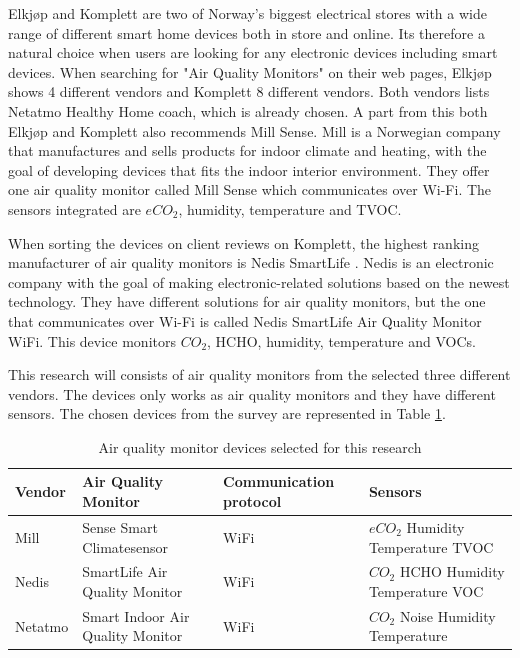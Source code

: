 Elkjøp \cite{Elkjøp} and Komplett \cite{Komplett} are two of Norway's biggest electrical stores with a wide range of different smart home devices both in store and online. Its therefore a natural choice when users are looking for any electronic devices including smart devices. When searching for "Air Quality Monitors" on their web pages, Elkjøp shows 4 different vendors and Komplett 8 different vendors. Both vendors lists Netatmo Healthy Home coach, which is already chosen. A part from this both Elkjøp and Komplett also recommends Mill Sense. Mill \cite{Mill} is a Norwegian company that manufactures and sells products for indoor climate and heating, with the goal of developing devices that fits the indoor interior environment. They offer one air quality monitor called Mill Sense which communicates over \gls{Wi-Fi}. The sensors integrated are \(eCO_2\), humidity, temperature and \gls{TVOC}.

When sorting the devices on client reviews on Komplett, the highest ranking manufacturer of air quality monitors is Nedis SmartLife \cite{Komplett}. Nedis \cite{Nedis} is an electronic company with the goal of making electronic-related solutions based on the newest technology. They have different solutions for air quality monitors, but the one that communicates over \gls{Wi-Fi} is called Nedis SmartLife Air Quality Monitor WiFi. This device monitors \(CO_2\), HCHO, humidity, temperature and VOCs. 

This research will consists of air quality monitors from the selected three different vendors. The devices only works as air quality monitors and they have different sensors. The chosen devices from the survey are represented in Table \ref{tab:AQMSurvey}. 

\begin{table}[H]
    \centering
    \caption{Air quality monitor devices selected for this research}
    \begin{tabular}{| p{1.5cm} | p{5.5cm} | p{3cm} | p{2cm} |} 
        \hline
        \textbf{Vendor} & \textbf{Air Quality Monitor} & \textbf{Communication protocol} & \textbf{Sensors} \\
        \hline
        Mill & Sense Smart Climatesensor & WiFi & \(eCO_2\) \newline Humidity \newline Temperature \newline \gls{TVOC} \\
        \hline
        Nedis & SmartLife Air Quality Monitor & WiFi & \(CO_2\) \newline HCHO \newline Humidity \newline Temperature \newline VOC \\
        \hline
        Netatmo & Smart Indoor Air Quality Monitor & WiFi & \(CO_2\) \newline Noise \newline Humidity \newline Temperature \\
        \hline
    \end{tabular}
    \label{tab:AQMSurvey}
\end{table}

